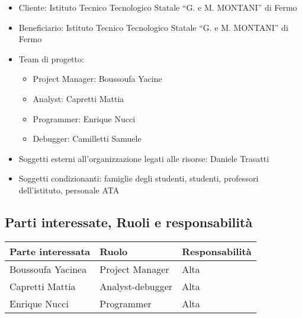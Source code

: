 \documentclass{article}
\begin{document}
\begin{flushleft}
\begin{itemize}
			\item Cliente: Istituto Tecnico Tecnologico Statale “G. e M. MONTANI” di Fermo

			\item Beneficiario: Istituto Tecnico Tecnologico Statale “G. e M. MONTANI” di Fermo

			\item Team di progetto:

			\begin{itemize}

				\item Project Manager: Boussoufa Yacine

				\item Analyst: Capretti Mattia

				\item Programmer: Enrique Nucci

				\item Debugger: Camilletti Samuele

			\end{itemize}

			\item Soggetti esterni all'organizzazione legati alle risorse: Daniele Trasatti

			\item Soggetti condizionanti: famiglie degli studenti, studenti, professori dell'istituto, personale ATA

		\end{itemize}

		\subsection{Parti interessate, Ruoli e responsabilità}

		\begin{tabular}{ |p{4cm}|p{4cm}|p{4cm}|  }

			\hline

			Parte interessata&Ruolo &Responsabilità\\

			\hline

			Boussoufa Yacinea&Project Manager&Alta\\

			\hline

			Capretti Mattia&Analyst-debugger&Alta\\

			\hline

			Enrique Nucci&Programmer&Alta\\


\end{tabular}
\end{flushleft}
\end{document}
